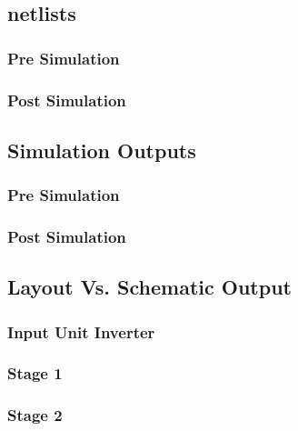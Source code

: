 \documentclass[conference]{IEEEtran}
\begin{document}
\subsection{netlists}
    \subsubsection{Pre Simulation} \hspace{1mm}
    
    \newpage
  \subsubsection{Post Simulation} \hspace{1mm}
    
    \newpage

  \subsection{Simulation Outputs}
    \subsubsection{Pre Simulation} \hspace{1mm}
    
    \newpage
    \subsubsection{Post Simulation} \hspace{1mm}
    
    \newpage

\newpage
\subsection{Layout Vs. Schematic Output}
  \subsubsection{Input Unit Inverter} \hspace{1mm}
  
  \newpage
  \subsubsection{Stage 1} \hspace{1mm}
  
  \newpage
  \subsubsection{Stage 2} \hspace{1mm}
  
  \newpage
\end{document}
